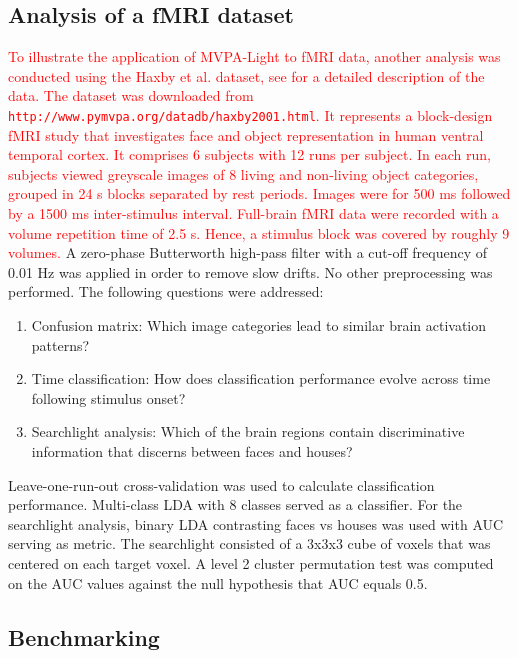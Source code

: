 \documentclass[utf8]{frontiersSCNS} %
\newcommand{\ttt}[1]{\texttt{#1}}
\newcommand{\red}[1]{\textcolor{red}{#1}}
\begin{document}
\subsection{Analysis of a fMRI dataset}
\red{To illustrate the application of MVPA-Light to fMRI data, another analysis was conducted using the Haxby et al. dataset, see \cite{Haxby2001} for a detailed description of the data. The dataset was downloaded from \ttt{http://www.pymvpa.org/datadb/haxby2001.html}.  It represents a block-design fMRI study that investigates face and object representation in human ventral temporal cortex. It comprises 6 subjects with 12 runs per subject. In each run, subjects viewed greyscale images of 8 living and non-living object categories,  grouped in 24 s blocks separated by rest periods. Images were for 500 ms followed by a 1500 ms inter-stimulus interval. Full-brain fMRI data were recorded with a volume repetition time of 2.5 s. Hence, a stimulus block was covered by roughly 9 volumes.} A zero-phase Butterworth high-pass filter with a cut-off frequency of 0.01 Hz was applied in order to remove slow drifts. No other preprocessing was performed. The following questions were addressed:

\begin{enumerate}
    \item Confusion matrix: Which image categories lead to similar brain activation patterns?
    \item Time classification: How does classification performance evolve across time following stimulus onset?
    \item Searchlight analysis: Which of the brain regions contain discriminative information that discerns between faces and houses?
\end{enumerate}

 Leave-one-run-out cross-validation was used to calculate classification performance. Multi-class LDA with 8 classes served as a classifier. For the searchlight analysis, binary LDA contrasting faces vs houses was used with AUC serving as metric. The searchlight consisted of a 3x3x3 cube of voxels that was centered on each target voxel. A level 2 cluster permutation test was computed on the AUC values against the null hypothesis that AUC equals 0.5.

\subsection{Benchmarking}
\end{document}
